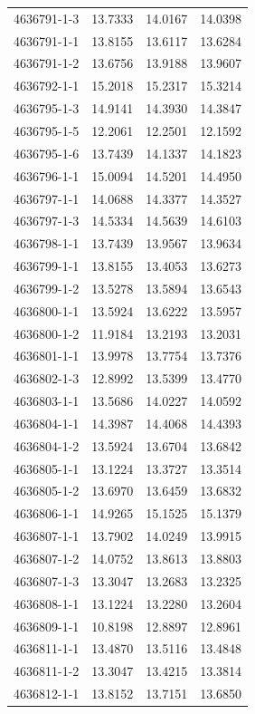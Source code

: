 \begin{longtable}{lrrr}
4636791-1-3 & 13.7333 & 14.0167 & 14.0398 \\
4636791-1-1 & 13.8155 & 13.6117 & 13.6284 \\
4636791-1-2 & 13.6756 & 13.9188 & 13.9607 \\
4636792-1-1 & 15.2018 & 15.2317 & 15.3214 \\
4636795-1-3 & 14.9141 & 14.3930 & 14.3847 \\
4636795-1-5 & 12.2061 & 12.2501 & 12.1592 \\
4636795-1-6 & 13.7439 & 14.1337 & 14.1823 \\
4636796-1-1 & 15.0094 & 14.5201 & 14.4950 \\
4636797-1-1 & 14.0688 & 14.3377 & 14.3527 \\
4636797-1-3 & 14.5334 & 14.5639 & 14.6103 \\
4636798-1-1 & 13.7439 & 13.9567 & 13.9634 \\
4636799-1-1 & 13.8155 & 13.4053 & 13.6273 \\
4636799-1-2 & 13.5278 & 13.5894 & 13.6543 \\
4636800-1-1 & 13.5924 & 13.6222 & 13.5957 \\
4636800-1-2 & 11.9184 & 13.2193 & 13.2031 \\
4636801-1-1 & 13.9978 & 13.7754 & 13.7376 \\
4636802-1-3 & 12.8992 & 13.5399 & 13.4770 \\
4636803-1-1 & 13.5686 & 14.0227 & 14.0592 \\
4636804-1-1 & 14.3987 & 14.4068 & 14.4393 \\
4636804-1-2 & 13.5924 & 13.6704 & 13.6842 \\
4636805-1-1 & 13.1224 & 13.3727 & 13.3514 \\
4636805-1-2 & 13.6970 & 13.6459 & 13.6832 \\
4636806-1-1 & 14.9265 & 15.1525 & 15.1379 \\
4636807-1-1 & 13.7902 & 14.0249 & 13.9915 \\
4636807-1-2 & 14.0752 & 13.8613 & 13.8803 \\
4636807-1-3 & 13.3047 & 13.2683 & 13.2325 \\
4636808-1-1 & 13.1224 & 13.2280 & 13.2604 \\
4636809-1-1 & 10.8198 & 12.8897 & 12.8961 \\
4636811-1-1 & 13.4870 & 13.5116 & 13.4848 \\
4636811-1-2 & 13.3047 & 13.4215 & 13.3814 \\
4636812-1-1 & 13.8152 & 13.7151 & 13.6850 \\

\end{longtable}
